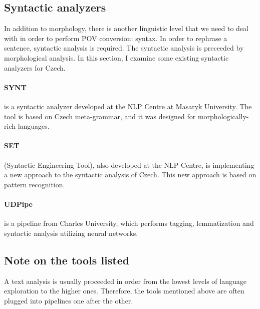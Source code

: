 \subsection{Syntactic analyzers}
\label{sec:synt-an}

In addition to morphology, there is another linguistic level that we need to deal with in order to perform POV conversion: syntax. In order to rephrase a sentence, syntactic analysis is required. The syntactic analysis is preceeded by morphological analysis. In this section, I examine some existing syntactic analyzers for Czech.

\paragraph{SYNT} is a syntactic analyzer developed at the NLP Centre at Masaryk University. The tool is based on Czech meta-grammar, and it was designed for morphologically-rich languages.

\paragraph{SET} (Syntactic Engineering Tool), also developed at the NLP Centre, is implementing a new approach to the syntactic analysis of Czech. This new approach is based on pattern recognition. \cite{set}

\paragraph{UDPipe} is a pipeline from Charles University, which performs tagging, lemmatization and syntactic analysis utilizing neural networks. \cite{straka-2018-udpipe}

\subsection*{Note on the tools listed}

A text analysis is usually proceeded in order from the lowest levels of language exploration to the higher ones. Therefore, the tools mentioned above are often plugged into pipelines one after the other.

